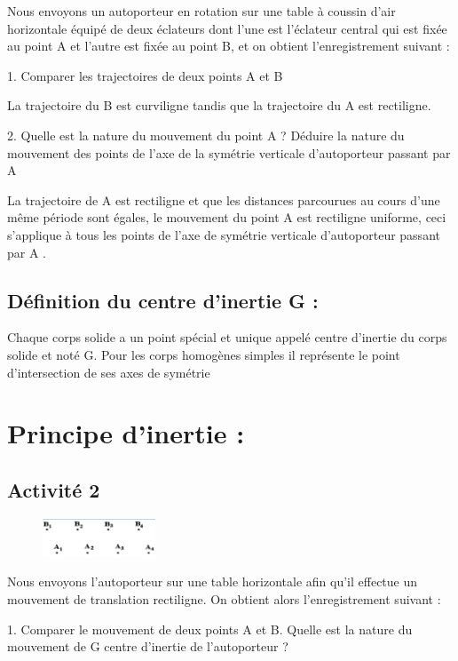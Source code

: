 \documentclass[12pt]{article}
\begin{document}
Nous envoyons un autoporteur en rotation sur une table à coussin d’air horizontale équipé de deux éclateurs dont l'une est l’éclateur central qui est fixée au point A et l'autre est fixée au point B, et on obtient l'enregistrement suivant :

1. Comparer les trajectoires de deux points A et B

La trajectoire du B est curviligne tandis que la trajectoire du A est rectiligne.

2. Quelle est la nature du mouvement du point A ? Déduire la nature du mouvement des points de l'axe de la symétrie verticale d’autoporteur passant
par A

La trajectoire de A est rectiligne et que les distances parcourues au cours d'une même
période sont égales, le mouvement du point A est rectiligne uniforme, ceci s'applique
à tous les points de l'axe de symétrie verticale d’autoporteur passant par A .

\subsection{Définition du centre d’inertie G : }

Chaque corps solide a un point spécial et unique appelé centre d’inertie du corps solide et noté G.
Pour les corps homogènes simples il représente le point d'intersection de ses axes de symétrie

\section{Principe d’inertie : }
\subsection{Activité 2}

\begin{figure}
\includegraphics[width=0.3\textwidth]{./img/img03.png}
\end{figure}


Nous envoyons l’autoporteur sur une table horizontale afin qu'il effectue un
mouvement de translation rectiligne. On obtient alors l'enregistrement
suivant :

1. Comparer le mouvement de deux points A et B. Quelle est la nature du mouvement de G centre d’inertie de
l’autoporteur ?
\end{document}
